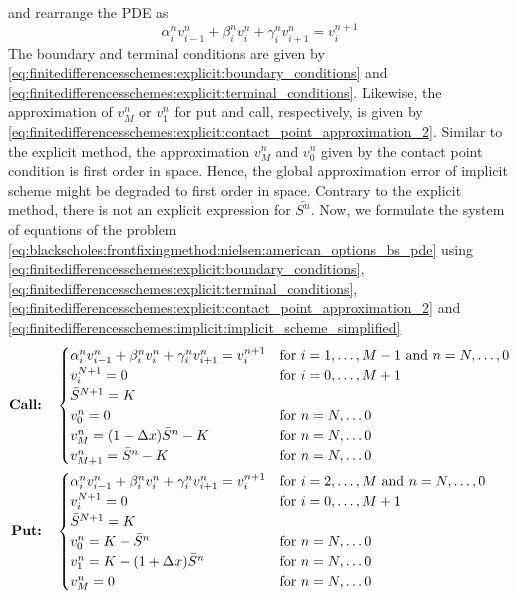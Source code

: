 and rearrange the PDE as
\begin{equation}
  \label{eq:finitedifferencesschemes:implicit:implicit_scheme_simplified}
  \alpha^{n}_{i}v^{n}_{i-1} + \beta^{n}_{i}v^{n}_{i} + \gamma^{n}_{i}v^{n}_{i+1} = v^{n+1}_{i}
\end{equation}
The boundary and terminal conditions are given by \eqref{eq:finitedifferencesschemes:explicit:boundary_conditions} and \eqref{eq:finitedifferencesschemes:explicit:terminal_conditions}. Likewise, the approximation of $v^{n}_{M}$ or $v^{n}_{1}$ for put and call, respectively, is given by \eqref{eq:finitedifferencesschemes:explicit:contact_point_approximation_2}. Similar to the explicit method, the approximation $v^{n}_{M}$ and $v^{n}_{0}$ given by the contact point condition is first order in space. Hence, the global approximation error of implicit scheme might be degraded to first order in space. Contrary to the explicit method, there is not an explicit expression for $\bar{S^n}$. Now, we formulate the system of equations of the problem \eqref{eq:blackscholes:frontfixingmethod:nielsen:american_options_bs_pde}
using \eqref{eq:finitedifferencesschemes:explicit:boundary_conditions}, \eqref{eq:finitedifferencesschemes:explicit:terminal_conditions}, \eqref{eq:finitedifferencesschemes:explicit:contact_point_approximation_2} and \eqref{eq:finitedifferencesschemes:implicit:implicit_scheme_simplified}
\begin{subequations}
  \label{eq:finitedifferencesschemes:implicit:nielsen_system_of_equation}
  \begin{align}
    \text{\textbf{Call:}} \quad& \begin{cases}
      \alpha^{n}_{i}v^{n}_{i-1} + \beta^{n}_{i}v^{n}_{i} + \gamma^{n}_{i}v^{n}_{i+1} = v^{n+1}_{i} & \text{for $i = 1, \dots, M-1$ and $n = N,\dots,0$} \\
      v^{N+1}_i = 0 & \text{for $i = 0, \dots, M+1$}\\
      \bar{S}^{N+1} = K \\
      v^{n}_0 = 0 & \text{for $n = N, \dots 0$}\\
      v^{n}_{M} = (1-\Delta{x})\bar{S}^n - K & \text{for $n = N, \dots 0$}\\
      v^{n}_{M+1} = \bar{S}^n - K  & \text{for $n = N, \dots 0$}
    \end{cases}\\
    \text{\textbf{Put:}} \quad& \begin{cases}
      \alpha^{n}_{i}v^{n}_{i-1} + \beta^{n}_{i}v^{n}_{i} + \gamma^{n}_{i}v^{n}_{i+1} = v^{n+1}_{i} & \text{for $i = 2, \dots, M$ and $n = N,\dots,0$} \\
      v^{N+1}_i = 0 & \text{for $i = 0, \dots, M+1$} \\
      \bar{S}^{N+1} = K \\
      v^{n}_{0} = K - \bar{S}^{n} & \text{for $n = N, \dots 0$}\\
      v^{n}_{1} =  K - (1+\Delta{x})\bar{S}^{n} & \text{for $n = N, \dots 0$}\\
      v^{n}_{M} = 0 & \text{for $n = N, \dots 0$}
    \end{cases}
  \end{align}
\end{subequations}
